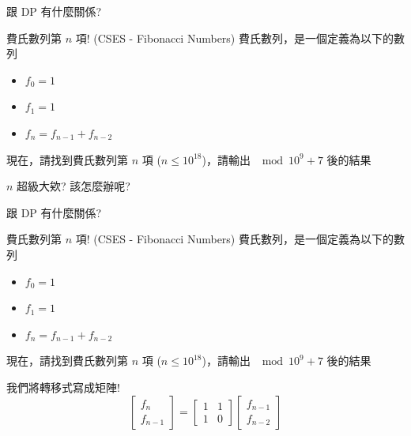 \documentclass[aspectratio=169]{beamer}
\begin{document}
\begin{frame}[fragile]{跟 DP 有什麼關係?}
    \begin{block}{費氏數列第 $n$ 項! (CSES - Fibonacci Numbers)}
        費氏數列，是一個定義為以下的數列
        \begin{itemize}
            \item $f_0 = 1$
            \item $f_1 = 1$
            \item $f_n = f_{n-1}+f_{n-2}$
        \end{itemize}
        現在，請找到費氏數列第 $n$ 項 ($n \le 10^{18}$)，請輸出 $\mod 10^9+7$ 後的結果
    \end{block}
    $n$ 超級大欸? 該怎麼辦呢?
\end{frame}

\begin{frame}[fragile]{跟 DP 有什麼關係?}
    \begin{block}{費氏數列第 $n$ 項! (CSES - Fibonacci Numbers)}
        費氏數列，是一個定義為以下的數列
        \begin{itemize}
            \item $f_0 = 1$
            \item $f_1 = 1$
            \item $f_n = f_{n-1}+f_{n-2}$
        \end{itemize}
        現在，請找到費氏數列第 $n$ 項 ($n \le 10^{18}$)，請輸出 $\mod 10^9+7$ 後的結果
    \end{block}
    我們將轉移式寫成矩陣!
    $$\begin{bmatrix}f_{n} \\ f_{n-1} \end{bmatrix} = \begin{bmatrix}1 & 1 \\ 1 & 0 \end{bmatrix} \begin{bmatrix}f_{n-1} \\ f_{n-2} \end{bmatrix}$$
\end{frame}
\end{document}
